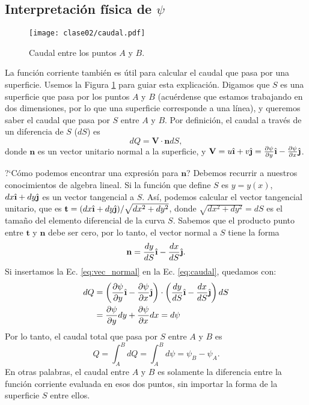 \subsection*{Interpretación física de $\psi$}

\begin{figure}[!h]
\centering
\texttt{[image: clase02/caudal.pdf]}
\caption{Caudal entre los puntos $A$ y $B$.}
\label{fig:caudal}
\end{figure}

La función corriente también es útil para calcular el caudal que pasa por una superficie.
Usemos la Figura \ref{fig:caudal} para guiar esta explicación.
Digamos que $S$ es una superficie que pasa por los puntos $A$ y $B$ (acuérdense que estamos trabajando en dos dimensiones, por lo que una superficie corresponde a una línea), y queremos saber el caudal que pasa por $S$ entre $A$ y $B$.
Por definición, el caudal a través de un diferencia de $S$ ($dS$) es 
%
\begin{equation}\label{eq:caudal}
dQ = \mathbf{V}\cdot\mathbf{n}dS,
\end{equation}
%
donde $\mathbf{n}$ es un vector unitario normal a la superficie, y $\mathbf{V}=u\ihat+v\jhat = \frac{\partial \psi}{\partial y} \ihat -\frac{\partial \psi}{\partial x}\jhat$.

\mbox{?`}Cómo podemos encontrar una expresión para $\mathbf{n}$? Debemos recurrir a nuestros conocimientos de algebra lineal.
Si la función que define $S$ es $y=y(x)$, $dx\ihat+dy\jhat$ es un vector tangencial a $S$.
Así, podemos calcular el vector tangencial unitario, que es $\mathbf{t}=(dx\ihat+dy\jhat)/\sqrt{dx^2+dy^2}$, donde $\sqrt{dx^2+dy^2}=dS$ es el tamaño del elemento diferencial de la curva $S$.
Sabemos que el producto punto entre $\mathbf{t}$ y $\mathbf{n}$ debe ser cero, por lo tanto, el vector normal a $S$ tiene la forma
%
\begin{equation}\label{eq:vec_normal}
\mathbf{n} = \frac{dy}{dS}\ihat - \frac{dx}{dS}\jhat.
\end{equation}
%
Si insertamos la Ec. \eqref{eq:vec_normal} en la Ec. \eqref{eq:caudal}, quedamos con:
%
\begin{align}
dQ &= \left(\frac{\partial \psi}{\partial y} \ihat -\frac{\partial \psi}{\partial x}\jhat\right)\cdot\left( \frac{dy}{dS}\ihat - \frac{dx}{dS}\jhat\right)dS\nonumber\\
   &= \frac{\partial \psi}{\partial y}dy +\frac{\partial \psi}{\partial x}dx = d\psi
\end{align}
%
Por lo tanto, el caudal total que pasa por $S$ entre $A$ y $B$ es
\begin{equation}\label{eq:caudal_psi}
Q=\int_A^BdQ = \int_A^Bd\psi = \psi_B-\psi_A.
\end{equation}
%
En otras palabras, el caudal entre $A$ y $B$ es solamente la diferencia entre la función corriente evaluada en esos dos puntos, sin importar la forma de la superficie $S$ entre ellos.

